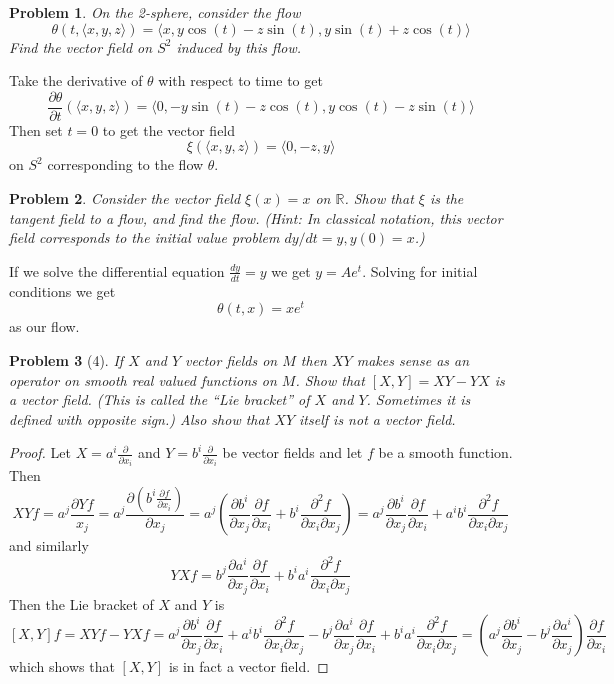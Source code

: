 \documentclass[10pt]{article}
\newcommand{\sk}{\vskip 10mm}
\newcommand{\bb}[1]{\mathbb{#1}}
\theoremstyle{plain}
\newtheorem{problem}{Problem}
\theoremstyle{remark}
\begin{document}
\begin{problem}
  On the 2-sphere, consider the flow
  \[
    \theta(t,\langle x,y,z\rangle)
    =\langle x,y\cos(t)-z\sin(t),y\sin(t)+z\cos(t)\rangle
  \]
  Find the vector field on $S^2$ induced by this flow.
\end{problem}

Take the derivative of $\theta$ with respect to time to get
\[
  \frac{\partial \theta}{\partial t}(\langle x,y,z\rangle) = \langle 0,-y\sin(t)-z\cos(t),y\cos(t)-z\sin(t)\rangle
\]
Then set $t=0$ to get the vector field
\[
  \xi(\langle x,y,z\rangle) = \langle 0,-z,y\rangle
\]
on $S^2$ corresponding to the flow $\theta$.

\sk

\begin{problem}
  Consider the vector field $\xi(x)=x$ on $\bb{R}$. Show that $\xi$ is the
  tangent field to a flow, and find the flow. (Hint: In classical notation,
  this vector field corresponds to the initial value problem $dy/dt=y,y(0)=x$.)
\end{problem}

If we solve the differential equation $\frac{dy}{dt}=y$ we get
$y=Ae^t$. Solving for initial conditions we get
\[
  \theta(t,x)=xe^t
\]
as our flow.

\sk

\begin{problem}[4]
  If $X$ and $Y$ vector fields on $M$ then $XY$ makes sense as an operator
  on smooth real valued functions on $M$. Show that $[X,Y]=XY-YX$ is a vector
  field. (This is called the ``Lie bracket'' of $X$ and $Y$. Sometimes it is
  defined with opposite sign.) Also show that $XY$ itself is not a vector
  field.
\end{problem}

\begin{proof}
  Let $X=a^i\frac{\partial}{\partial x_i}$ and $Y=b^i\frac{\partial}{\partial x_i}$ be vector fields and let
  $f$ be a smooth function. Then
  \[
    XYf = a^j\frac{\partial Yf}{x_j}=a^j\frac{\partial(b^i\frac{\partial f}{\partial x_i})}{\partial x_j}=a^j\left(\frac{\partial b^i}{\partial x_j}\frac{\partial f}{\partial x_i}+b^i\frac{\partial^2 f}{\partial x_i\partial x_j}\right) = a^j\frac{\partial b^i}{\partial x_j}\frac{\partial f}{\partial x_i}+a^ib^i\frac{\partial^2 f}{\partial x_i\partial x_j}
  \]
  and similarly
  \[
    YXf = b^j\frac{\partial a^i}{\partial x_j}\frac{\partial f}{\partial x_i}+b^ia^i\frac{\partial^2 f}{\partial x_i\partial x_j}
  \]
  Then the Lie bracket of $X$ and $Y$ is
  \[
    [X,Y]f=XYf-YXf=a^j\frac{\partial b^i}{\partial x_j}\frac{\partial f}{\partial x_i}+a^ib^i\frac{\partial^2 f}{\partial x_i\partial x_j}-b^j\frac{\partial a^i}{\partial x_j}\frac{\partial f}{\partial x_i}+b^ia^i\frac{\partial^2 f}{\partial x_i\partial x_j} = \left(a^j\frac{\partial b^i}{\partial x_j}-b^j\frac{\partial a^i}{\partial x_j}\right)\frac{\partial f}{\partial x_i}
  \]
  which shows that $[X,Y]$ is in fact a vector field.
\end{proof}
\end{document}

